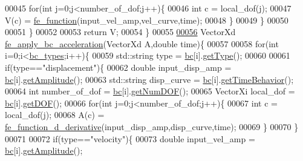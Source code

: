 \begin{DoxyCode}
00045             \textcolor{keywordflow}{for}(\textcolor{keywordtype}{int} j=0;j<number\_of\_dof;j++)\{
00046                 \textcolor{keywordtype}{int} c = local\_dof(j);
00047                 V(c) = \hyperlink{functions_8h_a5ce8a3cf9dcc8b599ac40f7f3a48f196}{fe\_function}(input\_vel\_amp,vel\_curve,time);
00048             \}
00049         \}
00050 
00051     \}
00052 
00053     \textcolor{keywordflow}{return} V;
00054 \}
00055 
\hyperlink{fe__apply__bc_8cpp_ac0ffd5f19ac286c91d431a4ec72dbab4}{00056} VectorXd \hyperlink{fe__apply__bc_8cpp_ac0ffd5f19ac286c91d431a4ec72dbab4}{fe\_apply\_bc\_acceleration}(VectorXd A,\textcolor{keywordtype}{double} time)\{
00057 
00058  \textcolor{keywordflow}{for}(\textcolor{keywordtype}{int} i=0;i<\hyperlink{_global_variables_8h_aad28f3904552ac6aa1642c44f0bc04e7}{bc\_types};i++)\{
00059         std::string type = \hyperlink{_global_variables_8h_a20bdb84bef6e8184528b6f4394cf4f7a}{bc}[i].\hyperlink{class_b_c_aa6afb3d4586f395578bef89c77e60449}{getType}();
00060 
00061         \textcolor{keywordflow}{if}(type==\textcolor{stringliteral}{"displacement"})\{
00062             \textcolor{keywordtype}{double} input\_disp\_amp = \hyperlink{_global_variables_8h_a20bdb84bef6e8184528b6f4394cf4f7a}{bc}[i].\hyperlink{class_b_c_ad648545e6ee046075350cd9b3c88e610}{getAmplitude}();
00063             std::string disp\_curve = \hyperlink{_global_variables_8h_a20bdb84bef6e8184528b6f4394cf4f7a}{bc}[i].\hyperlink{class_b_c_a3590d0a29a9261d99f21ee75340e5722}{getTimeBehavior}();
00064             \textcolor{keywordtype}{int} number\_of\_dof = \hyperlink{_global_variables_8h_a20bdb84bef6e8184528b6f4394cf4f7a}{bc}[i].\hyperlink{class_b_c_a6e42c3db5c67435bf2616768959866e9}{getNumDOF}();
00065             VectorXi local\_dof = \hyperlink{_global_variables_8h_a20bdb84bef6e8184528b6f4394cf4f7a}{bc}[i].\hyperlink{class_b_c_a0bc8eb90956a082ada5e4daa5e32c9fc}{getDOF}();
00066             \textcolor{keywordflow}{for}(\textcolor{keywordtype}{int} j=0;j<number\_of\_dof;j++)\{
00067                 \textcolor{keywordtype}{int} c = local\_dof(j);
00068                 A(c) = \hyperlink{functions_8h_afb02d53011656285452b16427dcd08dd}{fe\_function\_d\_derivative}(input\_disp\_amp,disp\_curve,time);
00069             \}
00070         \}
00071 
00072         \textcolor{keywordflow}{if}(type==\textcolor{stringliteral}{"velocity"})\{
00073             \textcolor{keywordtype}{double} input\_vel\_amp = \hyperlink{_global_variables_8h_a20bdb84bef6e8184528b6f4394cf4f7a}{bc}[i].\hyperlink{class_b_c_ad648545e6ee046075350cd9b3c88e610}{getAmplitude}();

\end{DoxyCode}
